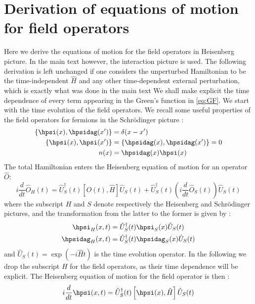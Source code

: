 \section{Derivation of equations of motion for field operators}
\label{app:EOM}
Here we derive the equations of motion for the field operators in Heisenberg picture. In the main text however, the interaction picture is used. The following derivation is left unchanged if one considers the unperturbed Hamiltonian to be the time-independent $\hat{H}$ and any other time-dependent external perturbation, which is exactly what was done in the main text
We shall make explicit the time dependence of every term appearing in the Green's function in \ref{eq:GF}. We start with the time evolution of the field operators. We recall some useful properties of the field operators for fermions in the Schrödinger picture :
\begin{align}
\begin{split}
	\{ \hpsi(x),\hpsidag(x')\} &= \delta (x-x') \\
	\{ \hpsi(x),\hpsi(x') \} &= \{ \hpsidag(x),\hpsidag(x') \} = 0 \\
	n(x) &= \hpsidag(x)\hpsi(x)
\end{split}	
\end{align}
 The total Hamiltonian enters the Heisenberg equation of motion for an operator $\hat{O}$:
\begin{equation}
	i\frac{d}{d t}\hat{O}_H(t) = \hat{U}^\dagger_S(t) \left[ \hat{O}(t),\hat{H} \right] \hat{U}_S(t) + \hat{U}^\dagger_S(t) (i \frac{d}{dt} \hat{O}_S(t)) \hat{U}_S(t)
\end{equation}
where the subscript $H$ and $S$ denote respectively the Heisenberg and Schrödinger pictures, and the transformation from the latter to the former is given by :
\begin{align}
\begin{split}
	\hpsi_H(x,t) &= \hat{U}^\dagger_S(t) \hpsi_S(x) \hat{U}_S(t) \\
	\hpsidag_H(x,t) &= \hat{U}^\dagger_S(t) \hpsidag_S(x) \hat{U}_S(t)
\end{split}
\end{align}
and $\hat{U}_S(t) = \exp(-i\hat{H}t) $ is the time evolution operator. In the following we drop the subscript $H$ for the field operators, as their time dependence will be explicit. The Heisenberg equation of motion for the field operator is then :
\begin{equation}
	i\frac{d}{dt} \hpsi(x,t) = \hat{U}^\dagger_S(t) \left[ \hpsi(x),\hat{H} \right] \hat{U}_S(t)
\end{equation}
